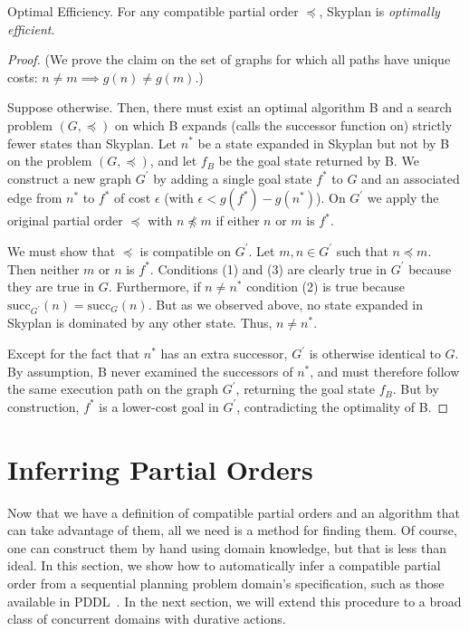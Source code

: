 \documentclass[letterpaper]{article}
\theoremstyle{plain} \newtheorem{theorem}{Theorem} \newtheorem{proposition}{Proposition} \newtheorem{lemma}{Lemma}
\theoremstyle{definition} \newtheorem{definition}{Definition} \newtheorem{conjecture}{Conjecture} \newtheorem*{example}{Example}
\theoremstyle{remark} \newtheorem*{remark}{Remark} \newtheorem*{note}{Note} \newtheorem{case}{Case}
\begin{document}
\begin{claim}{Optimal Efficiency.}\label{clm-optimally-efficient}
For any compatible partial order $\preceq$, Skyplan is \emph{optimally efficient}.
\end{claim}
\begin{proof} 
(We prove the claim on the set of graphs for which all paths have unique costs: $n \neq m \implies g(n) \neq g(m)$.)

Suppose otherwise. Then, there must exist an optimal algorithm B and a search problem $(G,\preceq)$ 
on which B expands (calls the successor function on) strictly fewer states than Skyplan. 
Let $n^{*}$ be a state expanded in Skyplan but not by B on the problem $(G,\preceq)$, and let
$f_{B}$ be the goal state returned by B. We construct a new graph $G^\prime$ by adding a single goal state $f^*$ to $G$ 
and an associated edge from $n^*$ to $f^*$ of cost $\epsilon$ (with $\epsilon < g(f^*)-g(n^*)$). 
On $G^\prime$ we apply the original partial order $\preceq$ with $n \npreceq m$ if either $n$ or $m$ is $f^*$.

We must show that $\preceq$ is compatible on $G^\prime$. 
Let $m,n \in G^\prime$ such that $n \preceq m$. Then neither $m$ or $n$ is $f^*$. Conditions (1) and (3) %
are clearly true in $G^\prime$ because they are true in $G$.  Furthermore, if $n \neq n^*$ condition (2) is true 
because $\mathrm{succ}_{G^\prime}(n) = \mathrm{succ}_{G}(n)$. 
But as we observed above, no state expanded in Skyplan is
dominated by any other state. Thus, $n \neq n^*$.

Except for the fact that $n^*$ has an extra successor, $G^\prime$ is otherwise
 identical to $G$. By assumption, B never examined the successors of $n^*$, and 
must therefore follow the same execution path on the graph $G^\prime$, returning the goal state $f_B$.
But by construction, $f^*$ is a lower-cost goal in $G^\prime$, contradicting the optimality of B.
 \end{proof}


\section{Inferring Partial Orders}

\newcommand{\po}{\preceq_R}

Now that we have a definition of compatible partial orders and an
algorithm that can take advantage of them, all we need is a method
for finding them. Of course, one can construct them by hand using
domain knowledge, but that is less than ideal. In this section, we
show how to automatically infer a compatible partial order from a
sequential planning problem domain's specification, such as those
available in PDDL~\citep{ghallab1998pddl,fox2003pddl2}. In the next
section, we will extend this procedure to a broad class of concurrent
domains with durative actions.
\end{document}
